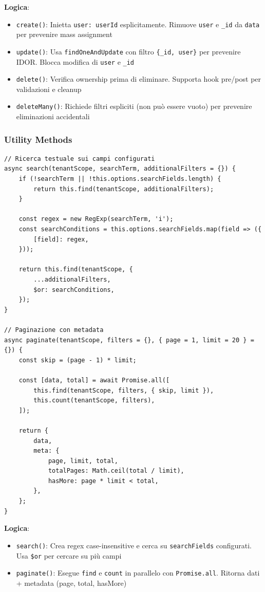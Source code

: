 \documentclass[11pt,a4paper]{article}
\begin{document}
\textbf{Logica}:
\begin{itemize}
    \item \texttt{create()}: Inietta \texttt{user: userId} esplicitamente. Rimuove \texttt{user} e \texttt{\_id} da \texttt{data} per prevenire mass assignment
    \item \texttt{update()}: Usa \texttt{findOneAndUpdate} con filtro \texttt{\{_id, user\}} per prevenire IDOR. Blocca modifica di \texttt{user} e \texttt{\_id}
    \item \texttt{delete()}: Verifica ownership prima di eliminare. Supporta hook pre/post per validazioni e cleanup
    \item \texttt{deleteMany()}: Richiede filtri espliciti (non può essere vuoto) per prevenire eliminazioni accidentali
\end{itemize}

\subsubsection{Utility Methods}

\begin{lstlisting}
// Ricerca testuale sui campi configurati
async search(tenantScope, searchTerm, additionalFilters = {}) {
    if (!searchTerm || !this.options.searchFields.length) {
        return this.find(tenantScope, additionalFilters);
    }
    
    const regex = new RegExp(searchTerm, 'i');
    const searchConditions = this.options.searchFields.map(field => ({
        [field]: regex,
    }));
    
    return this.find(tenantScope, {
        ...additionalFilters,
        $or: searchConditions,
    });
}

// Paginazione con metadata
async paginate(tenantScope, filters = {}, { page = 1, limit = 20 } = {}) {
    const skip = (page - 1) * limit;
    
    const [data, total] = await Promise.all([
        this.find(tenantScope, filters, { skip, limit }),
        this.count(tenantScope, filters),
    ]);
    
    return {
        data,
        meta: {
            page, limit, total,
            totalPages: Math.ceil(total / limit),
            hasMore: page * limit < total,
        },
    };
}
\end{lstlisting}

\textbf{Logica}:
\begin{itemize}
    \item \texttt{search()}: Crea regex case-insensitive e cerca su \texttt{searchFields} configurati. Usa \texttt{\$or} per cercare su più campi
    \item \texttt{paginate()}: Esegue \texttt{find} e \texttt{count} in parallelo con \texttt{Promise.all}. Ritorna dati + metadata (page, total, hasMore)
\end{itemize}
\end{document}
